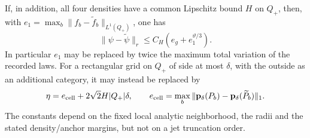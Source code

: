 \begin{theorem}
If, in addition, all four densities have a common Lipschitz bound $H$
on $Q_+$, then, with
$e_1=\max_b\|f_b-\widetilde f_b\|_{L^1(Q_+)}$, one has
\begin{equation}\label{eq:v60-weak-density-bound}
       \|\psi-\widetilde\psi\|_r
                          \le C_H(e_g+e_1^{\vartheta/3}).
\end{equation}
In particular $e_1$ may be replaced by twice the maximum total variation
of the recorded laws.  For a rectangular grid on $Q_+$ of side at most
$\delta$, with the outside as an additional category, it may instead
be replaced by
\begin{equation}\label{eq:v60-histogram-error}
 \eta=e_{\rm cell}+2\sqrt2 H|Q_+|\delta,
 \qquad
 e_{\rm cell}=\max_b
       \|\mathbf p_\delta(P_b)-\mathbf p_\delta(\widetilde P_b)\|_1.
\end{equation}
The constants depend on the fixed local analytic neighborhood, the radii
and the stated density/anchor margins, but not on a jet truncation order.
\end{theorem}

